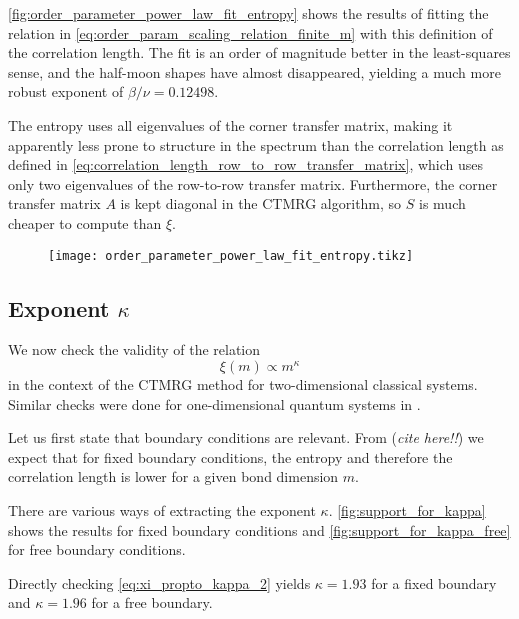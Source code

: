 \autoref{fig:order_parameter_power_law_fit_entropy} shows the results of fitting the relation in
\autoref{eq:order_param_scaling_relation_finite_m} with this definition of the correlation length. The fit is an order
of magnitude better in the least-squares sense, and the half-moon shapes have almost disappeared,
yielding a much more robust exponent of $\beta/\nu = 0.12498$.

The entropy uses all eigenvalues of the corner transfer matrix, making it apparently less prone to structure in the
spectrum than the correlation length as defined in \autoref{eq:correlation_length_row_to_row_transfer_matrix},
which uses only two eigenvalues of the row-to-row transfer matrix.
Furthermore, the corner transfer matrix $A$ is kept diagonal in the CTMRG algorithm,
so $S$ is much cheaper to compute than $\xi$.

\begin{figure}
  \texttt{[image: order\_parameter\_power\_law\_fit\_entropy.tikz]}
  \caption{}\label{fig:order_parameter_power_law_fit_entropy}
\end{figure}

\subsection{Exponent $\kappa$}

We now check the validity of the relation
\begin{equation}\label{eq:xi_propto_kappa_2}
  \xi(m) \propto m^{\kappa}
\end{equation}
in the context of the CTMRG method for two-dimensional
classical systems. Similar checks were done for one-dimensional quantum systems in \cite{tagliacozzo2008scaling}.

Let us first state that boundary conditions are relevant.
From (\emph{cite here!!}) we expect that for fixed boundary conditions,
the entropy and therefore the correlation length is lower for a given bond dimension $m$.

There are various ways of extracting the exponent $\kappa$.
\autoref{fig:support_for_kappa} shows the results for fixed boundary conditions and \autoref{fig:support_for_kappa_free}
for free boundary conditions.

Directly checking \autoref{eq:xi_propto_kappa_2} yields $\kappa = 1.93$ for a fixed boundary
and $\kappa = 1.96$ for a free boundary.

